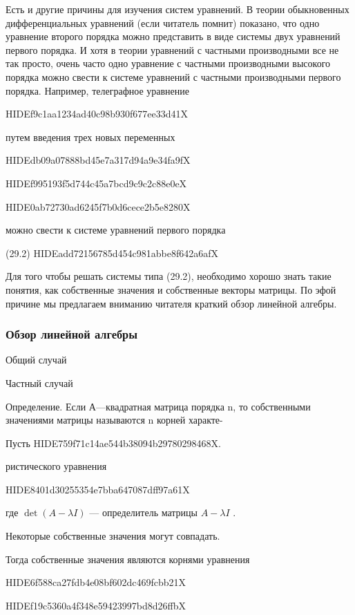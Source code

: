 \documentclass[
  ukrainian,
]{article}
\begin{document}
Есть и другие причины для изучения систем уравнений. В теории
обыкновенных дифференциальных уравнений (если читатель помнит) показано,
что одно уравнение второго порядка можно представить в виде системы двух
уравнений первого порядка. И хотя в теории уравнений с частными
производными все не так просто, очень часто одно уравнение с частными
производными высокого порядка можно свести к системе уравнений с
частными производными первого порядка. Например, телеграфное уравнение

HIDEf9c1aa1234ad40c98b930f677ee33d41X

путем введения трех новых переменных

HIDEdb09a07888bd45e7a317d94a9e34fa9fX

HIDEf995193f5d744c45a7bcd9c9c2c88e0eX

HIDE0ab72730ad6245f7b0d6cece2b5e8280X

можно свести к системе уравнений первого порядка

(29.2) HIDEadd72156785d454c981abbe8f642a6afX

Для того чтобы решать системы типа (29.2), необходимо хорошо знать такие
понятия, как собственные значения и собственные векторы матрицы. По эфой
причине мы предлагаем вниманию читателя краткий обзор линейной алгебры.

\subsubsection{Обзор линейной
алгебры}\label{ux43eux431ux437ux43eux440-ux43bux438ux43dux435ux439ux43dux43eux439-ux430ux43bux433ux435ux431ux440ux44b}

Общий случай

Частный случай

Определение. Если А---квадратная матрица порядка n, то собственными
значениями матрицы называются n корней характе-

Пусть HIDE759f71c14ae544b38094b29780298468X.

ристического уравнения

HIDE8401d30255354e7bba647087dff97a61X

где \(\det(A-\lambda I)\) --- определитель матрицы \(A-\lambda I\) .

Некоторые собственные значения могут совпадать.

Тогда собственные значения являются корнями уравнения

HIDE6f588ca27fdb4e08bf602dc469fcbb21X

HIDEf19c5360a4f348e59423997bd8d26ffbX
\end{document}
